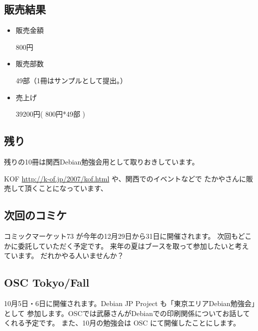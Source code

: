 \documentclass[mingoth,a4paper]{jsarticle}
\begin{document}
\subsection{販売結果}

\begin{itemize}
	\item 販売金額 

		800円

	\item 販売部数
 
		49部（1冊はサンプルとして提出。）

	\item 売上げ
 
		39200円( 800円*49部 )
\end{itemize}

\subsection{残り}
残りの10冊は関西Debian勉強会用として取りおきしています。

KOF \url{http://k-of.jp/2007/kof.html} や、関西でのイベントなどで
たかやさんに販売して頂くことになっています、

\subsection{次回のコミケ}
コミックマーケット73 が今年の12月29日から31日に開催されます。
次回もどこかに委託していただく予定です。
来年の夏はブースを取って参加したいと考えています。
だれかやる人いませんか？



\subsection{OSC Tokyo/Fall}
10月5日・6日に開催されます。Debian JP Project も「東京エリアDebian勉強会」として
参加します。OSCでは武藤さんがDebianでの印刷関係についてお話してくれる予定です。
また、10月の勉強会は OSC にて開催したことにします。


\cleartooddpage
\end{document}
